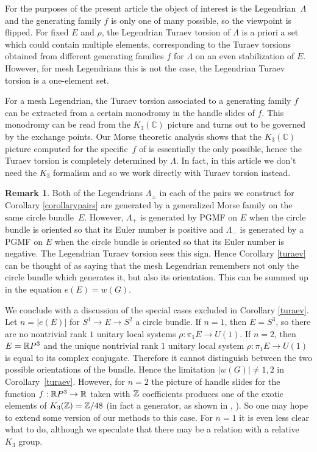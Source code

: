 \documentclass[11pt]{article}
\numberwithin{equation}{section}\providecommand{\dpl}{\displaystyle}
\theoremstyle{plain}
\theoremstyle{definition}
\newtheorem{remark}[theorem]{Remark}
\newcommand{\bC}{\mathbb{C}}\newcommand{\bD}{\mathbb{D}}
\begin{document}
For the purposes of the present article the object of interest is the Legendrian~$\Lambda$ and the generating family $f$ is only one of many possible, so the viewpoint is flipped. For fixed $E$ and $\rho$, the Legendrian Turaev torsion of $\Lambda$ is a priori a set which could contain multiple elements, corresponding to the Turaev torsions obtained from different generating families $f$ for $\Lambda$ on an even stabilization of $E$. However, for mesh Legendrians this is not the case, the Legendrian Turaev torsion is a one-element set.

For a mesh Legendrian, the Turaev torsion associated to a generating family $f$ can be extracted from a certain monodromy in the handle slides of $f$. This monodromy can be read from the $K_3(\bC)$ picture and turns out to be governed by the exchange points. Our Morse theoretic analysis shows that the $K_3(\bC)$ picture computed for the specific~$f$ of \cite{IK93} is essentially the only possible, hence the Turaev torsion is completely determined by $\Lambda$. In fact, in this article we don't need the $K_3$ formalism and so we work directly with Turaev torsion instead.

\begin{remark} Both of the Legendrians $\Lambda_{\pm}$ in each of the pairs we construct for Corollary \ref{corollarypairs} are generated by a generalized Morse family on the same circle bundle~$E$. However, $\Lambda_+$ is generated by PGMF on $E$ when the circle bundle is oriented so that its Euler number is positive and $\Lambda_-$ is generated by a PGMF on $E$ when the circle bundle is oriented so that its Euler number is negative. The Legendrian Turaev torsion sees this sign. Hence Corollary \ref{turaev} can be thought of as saying that the mesh Legendrian remembers not only the circle bundle which generates it, but also its orientation. This can be summed up in the equation $e(E)=w(G)$.
\end{remark}

We conclude with a discussion of the special cases excluded in Corollary \ref{turaev}. Let $n=|e(E)|$ for $S^1 \to E \to S^2$ a circle bundle. If $n=1$, then $E=S^3$, so there are no nontrivial rank $1$ unitary local systems $\rho: \pi_1E \to U(1)$. If $n=2$, then $E=\mathbb{R} P^3$ and the unique nontrivial rank $1$ unitary local system $\rho : \pi_1E \to U(1)$ is equal to its complex conjugate. Therefore it cannot distinguish between the two possible orientations of the bundle. Hence the limitation $|w(G)| \neq 1,2$ in Corollary~\ref{turaev}. However, for $n=2$ the picture of handle slides for the function $f:\mathbb{R} P^3 \to \mathbb{R}$ taken with $\mathbb{Z}$ coefficients produces one of the exotic elements of $K_3(\mathbb{Z})=\mathbb{Z}/48$ (in fact a generator, as shown in \cite{IK93a}, \cite{IK93}). So one may hope to extend some version of our methods to this case. For $n=1$ it is even less clear what to do, although we speculate that there may be a relation with a relative $K_3$ group.
\end{document}
